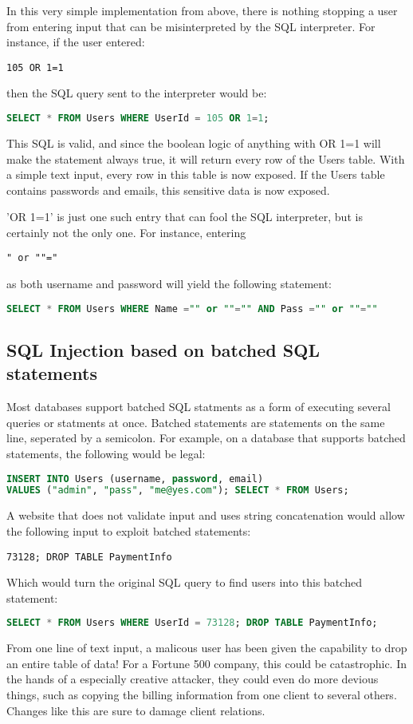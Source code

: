 In this very simple implementation from above, there is nothing stopping a user from entering input that can be misinterpreted by the SQL interpreter. For instance, if the user entered:
\begin{verbatim}
105 OR 1=1
\end{verbatim}
then the SQL query sent to the interpreter would be:
\begin{lstlisting}[language = SQL]
SELECT * FROM Users WHERE UserId = 105 OR 1=1;
\end{lstlisting}
This SQL is valid, and since the boolean logic of anything with OR 1=1 will make the statement always true, it will return every row of the Users table. With a simple text input, every row in this table is now exposed. If the Users table contains passwords and emails, this sensitive data is now exposed.

'OR 1=1' is just one such entry that can fool the SQL interpreter, but is certainly not the only one. For instance, entering
\begin{verbatim}
" or ""="
\end{verbatim}
as both username and password will yield the following statement:
\begin{lstlisting}[language = SQL]
SELECT * FROM Users WHERE Name ="" or ""="" AND Pass ="" or ""=""
\end{lstlisting}

\subsection{SQL Injection based on batched SQL statements}

Most databases support batched SQL statments as a form of executing several queries or statments at once. Batched statements are statements on the same line, seperated by a semicolon. For example, on a database that supports batched statements, the following would be legal:
\begin{lstlisting}[language = SQL]
INSERT INTO Users (username, password, email)
VALUES ("admin", "pass", "me@yes.com"); SELECT * FROM Users;
\end{lstlisting}
A website that does not validate input and uses string concatenation would allow the following input to exploit batched statements:
\begin{verbatim}
73128; DROP TABLE PaymentInfo
\end{verbatim}
Which would turn the original SQL query to find users into this batched statement:
\begin{lstlisting}[language = SQL]
SELECT * FROM Users WHERE UserId = 73128; DROP TABLE PaymentInfo;
\end{lstlisting}
From one line of text input, a malicous user has been given the capability to drop an entire table of data! For a Fortune 500 company, this could be catastrophic. In the hands of a especially creative attacker, they could even do more devious things, such as copying the billing information from one client to several others. Changes like this are sure to damage client relations.

